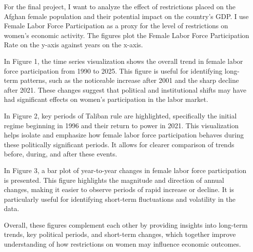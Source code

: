 \documentclass{article}
\begin{document}
For the final project, I want to analyze the effect of restrictions placed on the Afghan female population and their potential impact on the country's GDP. I use Female Labor Force Participation as a proxy for the level of restrictions on women’s economic activity. The figures plot the Female Labor Force Participation Rate on the y-axis against years on the x-axis.

In Figure 1, the time series visualization shows the overall trend in female labor force participation from 1990 to 2025. This figure is useful for identifying long-term patterns, such as the noticeable increase after 2001 and the sharp decline after 2021. These changes suggest that political and institutional shifts may have had significant effects on women’s participation in the labor market.

In Figure 2, key periods of Taliban rule are highlighted, specifically the initial regime beginning in 1996 and their return to power in 2021. This visualization helps isolate and emphasize how female labor force participation behaves during these politically significant periods. It allows for clearer comparison of trends before, during, and after these events.

In Figure 3, a bar plot of year-to-year changes in female labor force participation is presented. This figure highlights the magnitude and direction of annual changes, making it easier to observe periods of rapid increase or decline. It is particularly useful for identifying short-term fluctuations and volatility in the data.

Overall, these figures complement each other by providing insights into long-term trends, key political periods, and short-term changes, which together improve understanding of how restrictions on women may influence economic outcomes.
\end{document}
